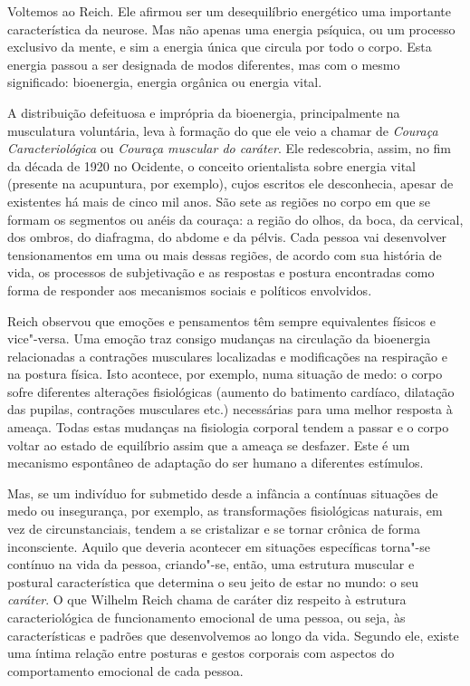 Voltemos ao Reich. Ele afirmou ser um desequilíbrio energético uma
importante característica da neurose. Mas não apenas uma energia
psíquica, ou um processo exclusivo da mente, e sim a energia única que
circula por todo o corpo. Esta energia passou a ser designada de modos
diferentes, mas com o mesmo significado: bioenergia, energia orgânica ou
energia vital.

A distribuição defeituosa e imprópria da bioenergia, principalmente na
musculatura voluntária, leva à formação do que ele veio a chamar de
\emph{Couraça Caracteriológica} ou \emph{Couraça muscular do caráter}.
Ele redescobria, assim, no fim da década de 1920 no Ocidente, o
conceito orientalista sobre energia vital (presente na acupuntura, por
exemplo), cujos escritos ele desconhecia, apesar de existentes há mais
de cinco mil anos. São sete as regiões no corpo em que se formam os
segmentos ou anéis da couraça: a região do olhos, da boca, da cervical,
dos ombros, do diafragma, do abdome e da pélvis. Cada pessoa vai
desenvolver tensionamentos em uma ou mais dessas regiões, de acordo com
sua história de vida, os processos de subjetivação e as respostas e
postura encontradas como forma de responder aos mecanismos sociais e
políticos envolvidos.

Reich observou que emoções e pensamentos têm sempre equivalentes físicos
e vice"-versa. Uma emoção traz consigo mudanças na circulação da
bioenergia relacionadas a contrações musculares localizadas e
modificações na respiração e na postura física. Isto acontece, por
exemplo, numa situação de medo: o corpo sofre diferentes alterações
fisiológicas (aumento do batimento cardíaco, dilatação das pupilas,
contrações musculares etc.) necessárias para uma melhor resposta à
ameaça. Todas estas mudanças na fisiologia corporal tendem a passar e o
corpo voltar ao estado de equilíbrio assim que a ameaça se desfazer.
Este é um mecanismo espontâneo de adaptação do ser humano a diferentes
estímulos.

Mas, se um indivíduo for submetido desde a infância a contínuas
situações de medo ou insegurança, por exemplo, as transformações
fisiológicas naturais, em vez de circunstanciais, tendem a se
cristalizar e se tornar crônica de forma inconsciente. Aquilo que
deveria acontecer em situações específicas torna"-se contínuo na vida da
pessoa, criando"-se, então, uma estrutura muscular e postural
característica que determina o seu jeito de estar no mundo: o seu
\emph{caráter}. O que Wilhelm Reich chama de caráter diz respeito à
estrutura caracteriológica de funcionamento emocional de uma pessoa, ou
seja, às características e padrões que desenvolvemos ao longo da vida.
Segundo ele, existe uma íntima relação entre posturas e gestos corporais
com aspectos do comportamento emocional de cada pessoa.

